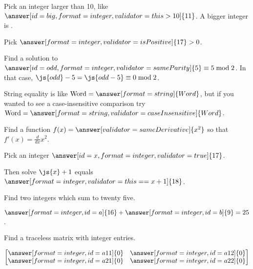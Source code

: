 \documentclass{ximera}
\begin{document}
\begin{problem}
  Pick an integer larger than 10, like $\answer[id=big,format=integer,validator=this>10]{11}$.  A bigger integer is .

  Pick $\answer[format=integer,validator=isPositive]{17} > 0$.

  Find a solution to $\answer[id=odd,format=integer,validator=sameParity]{5} \equiv 5 \bmod 2$.  In that case, $\js{odd} - 5 = \js{odd-5} \equiv 0 \bmod 2$.

  String equality is like $\mbox{Word} = \answer[format=string]{Word}$, but if you wanted to see a case-insensitive comparison try $\mbox{Word} = \answer[format=string,validator=caseInsensitive]{Word}$.

  Find a function $f(x) = \answer[validator=sameDerivative]{x^2}$ so that $f'(x) = \frac{d}{dx} x^2$.
\end{problem}

\begin{problem}
  Pick an integer $\answer[id=x,format=integer,validator=true]{17}$.

  Then solve $\js{x} + 1$ equals $\answer[format=integer,validator=this==x+1]{18}$.
\end{problem}

\begin{problem}
  Find two integers which sum to twenty five.

  \begin{validator}[a+b==25]
    $\answer[format=integer,id=a]{16} + \answer[format=integer,id=b]{9} = 25$.
  \end{validator}


  Find a traceless matrix with integer entries.
  \begin{validator}[a11+a22==0]
    \[
      \begin{bmatrix}
        \answer[format=integer,id=a11]{0} &         \answer[format=integer,id=a12]{0} \\
        \answer[format=integer,id=a21]{0} &         \answer[format=integer,id=a22]{0} \\
      \end{bmatrix}
      \]
  \end{validator}

\end{problem}
\end{document}
